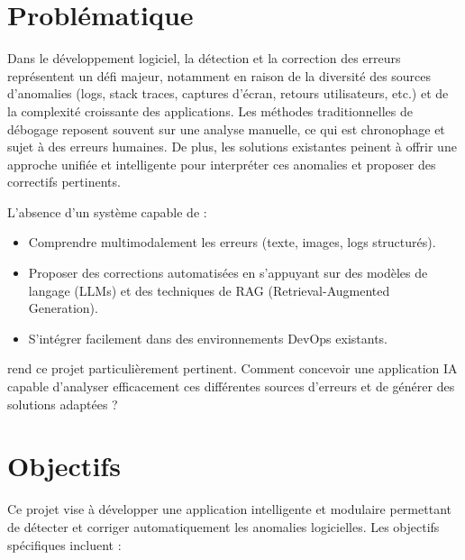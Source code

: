 \documentclass[12pt,a4paper]{report}
\begin{document}
	
	\chapter*{Problématique}
	
	Dans le développement logiciel, la détection et la correction des erreurs représentent un défi majeur, notamment en raison de la diversité des sources d’anomalies (logs, stack traces, captures d’écran, retours utilisateurs, etc.) et de la complexité croissante des applications. Les méthodes traditionnelles de débogage reposent souvent sur une analyse manuelle, ce qui est chronophage et sujet à des erreurs humaines. De plus, les solutions existantes peinent à offrir une approche unifiée et intelligente pour interpréter ces anomalies et proposer des correctifs pertinents.
	
	L’absence d’un système capable de :
	
	\begin{itemize}
		\item Comprendre multimodalement les erreurs (texte, images, logs structurés).
		
		\item Proposer des corrections automatisées en s’appuyant sur des modèles de langage (LLMs) et des techniques de RAG (Retrieval-Augmented Generation).
		
		\item S’intégrer facilement dans des environnements DevOps existants.
	\end{itemize}
	
	rend ce projet particulièrement pertinent. Comment concevoir une application IA capable d’analyser efficacement ces différentes sources d’erreurs et de générer des solutions adaptées ?
	
	\chapter*{Objectifs}
	
	Ce projet vise à développer une application intelligente et modulaire permettant de détecter et corriger automatiquement les anomalies logicielles. Les objectifs spécifiques incluent :
	
\end{document}
